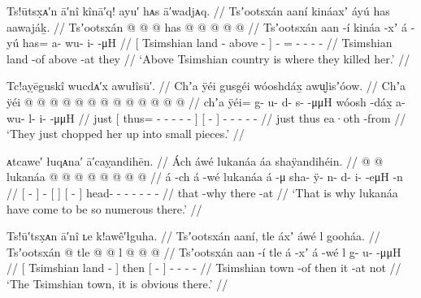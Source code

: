 \ex\label{ex:89-57-above-Tsimshian-land}%
%
\begingl
	\glpreamble	Ts!ūtsx̣ᴀ′n ā′nî kînā′q! ayu′ hᴀs ā′wadjᴀq. //
	\glpreamble	Tsʼootsxán aaní kináaxʼ áyú has aawajáḵ. //
	\gla	{} Tsʼootsxán  @ {}  @ {} {}
		 @ {}
		has @  @ {} @ {} @ {} @ {} //
	\glb	{} Tsʼootsxán aan -í kináa -xʼ {}
		á -yú
		has= a- wu- i-  -μH //
	\glc	{}[ Tsimshian land - above - {}]
		 -
		= - - -  - //
	\gld	{} Tsimshian land -of above -at {}
		 {}
		they  {} {} {} {} //
	\glft	‘Above Tsimshian country is where they killed her.’
		//
\endgl
\xe

\ex\label{ex:89-58-chop-small-pieces}%
%
\begingl
	\glpreamble	Tc!aỵēguskî wucdᴀ′x awułîsū′. //
	\glpreamble	Chʼa ÿéi gusgéi wóoshdáx̱ awu̬lisʼóow. //
	\gla	Chʼa {} ÿéi @  @ {} @ {} @ {} @ {} @ {} @ {} {}
		{}  @ {} {}
		 @ {} @ {} @ {} @ {} @ {} //
	\glb	chʼa {} ÿéi= g- u- d- s-  -μμH {} {}
		{} wóosh -dáx̱ {}
		a- wu- l- i-  -μμH //
	\glc	just {}[ thus= - - - -  - \· {}]
		{}[  - {}]
		- - - -  - //
	\gld	just {} thus  {} {} {} {} {} {} {}
		{} ea·oth -from {}
		 {} {} {} {} {} //
	\glft	‘They just chopped her up into small pieces.’
		//
\endgl
\xe

\ex\label{ex:89-59-many-lukanaa}%
%
\begingl
	\glpreamble	ᴀtcawe′ łuqᴀna′ ā′caỵandihēn. //
	\glpreamble	Ách áwé lukanáa áa shaÿandihéin. //
	\gla	{}  @ {} {}
		 @ {}
		{} lukanáa {}
		{}  @ {} {}
		 @ {} @ {} @ {} @ {} @ {} @ {} @ {} //
	\glb	{} á -ch {}
		á -wé
		{} lukanáa {}
		{} á -μ {}
		sha- ÿ- n- d- i-  -eμH -n //
	\glc	{}[  - {}]
		 -
		{}[  {}]
		{}[  - {}]
		head- - - - -  - - //
	\gld	{} that -why {}
		 {}
		{}  {}
		{} there -at {}
		 {} {} {} {} {} {} {} //
	\glft	‘That is why lukanáa have come to be so numerous there.’
		//
\endgl
\xe

\ex\label{ex:89-60-Tsimshian-town}%
%
\begingl
	\glpreamble	Ts!ū′tsx̣ᴀn ā′nî ʟe k!awê′łguha. //
	\glpreamble	Tsʼootsxán aaní, tle áxʼ áwé l gooháa. //
	\gla	{} Tsʼootsxán  @ {} {}
		tle {}  @ {} {}
		 @ {}
		l  @ {} @ {} @ {} //
	\glb	{} Tsʼootsxán aan -í {}
		tle {} á -xʼ {}
		á -wé
		l g- u-  -μμH //
	\glc	{}[ Tsimshian land - {}]
		then {}[  - {}]
		 -
		 - -  - //
	\gld	{} Tsimshian town -of {}
		then {} it -at {}
		 {}
		not  {} {} {} //
	\glft	‘The Tsimshian town, it is obvious there.’
		//
\endgl
\xe

